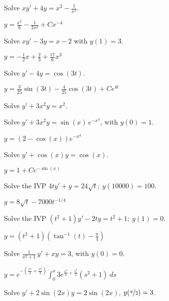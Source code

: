 \begin{exercise}
Solve $xy' + 4y = x^2 - \frac{1}{x^2}$.
\end{exercise}
\comboSol{%
}
{%
$y = \frac{x^2}{6} - \frac{1}{2x^2} + Cx^{-4}$
}

\begin{exercise}
Solve $xy' - 3y = x-2$ with $y(1) = 3$. 
\end{exercise}
\comboSol{%
}
{%
$y = -\frac{1}{2}x + \frac{2}{3} + \frac{17}{6}x^3$
}

\begin{exercise}
Solve $y' - 4y = \cos{(3t)}$.
\end{exercise}
\comboSol{%
}
{%
$y = \frac{3}{25}\sin(3t) - \frac{4}{25}\cos(3t) + Ce^{4t}$
}

\begin{exercise}\ansMark%
Solve $y'+3 x^2 y = x^2$.
\end{exercise}

\begin{exercise}
Solve $y' + 3x^2y = \sin(x) \, e^{-x^3}$, with $y(0) = 1$.
\end{exercise}
\comboSol{%
}
{%
$y = (2-\cos(x))e^{-x^3}$
}

\begin{exercise}
Solve $y' + \cos (x) y = \cos(x)$.
\end{exercise}
\comboSol{%
}
{%
$y = 1 + Ce^{-\sin(x)}$
}

\begin{exercise}
Solve the IVP $4ty'+y=24\sqrt{t};\ y(10000)=100.$ %
\end{exercise}
\comboSol{%
}
{%
$y = 8\sqrt{t} - 7000t^{-1/4}$
}

\begin{exercise}
Solve the IVP $(t^2+1)y' - 2ty = t^2+1; \ y(1)=0$. %
\end{exercise}
\comboSol{%
}
{%
$y = (t^2 + 1)\left(\tan^{-1}(t) - \frac{\pi}{4}\right)$
}

\begin{exercise}
Solve $\frac{1}{x^2+1} \, y' + x y = 3$, with $y(0) = 0$.
\end{exercise}
\comboSol{%
}
{%
$y = e^{-\left(\frac{x^4}{4} + \frac{x^2}{2}\right)}\int_0^x 3e^{\frac{s^4}{4} + \frac{s^2}{2}}(s^2 + 1)\ ds$
}

\begin{exercise}\ansMark%
Solve $y'+ 2\sin(2x) y = 2\sin(2x)$, $y(\nicefrac{\pi}{2}) = 3$.
\end{exercise}

